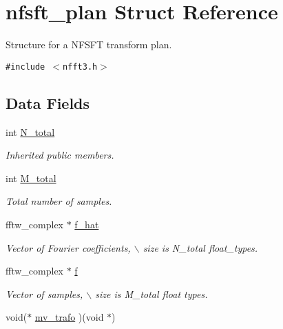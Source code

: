\hypertarget{structnfsft__plan}{
\section{nfsft\_\-plan Struct Reference}
\label{structnfsft__plan}
}
Structure for a NFSFT transform plan.  


{\tt \#include $<$nfft3.h$>$}

\subsection*{Data Fields}
\begin{CompactItemize}
\item 
int \hyperlink{structnfsft__plan_57fe4569f9109b92ed55caeddce686b8}{N\_\-total}
\begin{CompactList}\small\item\em Inherited public members. \item\end{CompactList}\item 
\hypertarget{structnfsft__plan_e83b4ef24662500a1c0374f9e0bf73ed}{
int \hyperlink{structnfsft__plan_e83b4ef24662500a1c0374f9e0bf73ed}{M\_\-total}}
\label{structnfsft__plan_e83b4ef24662500a1c0374f9e0bf73ed}

\begin{CompactList}\small\item\em Total number of samples. \item\end{CompactList}\item 
\hypertarget{structnfsft__plan_f3f147694cf5d7ac7b658288bf2cfb42}{
fftw\_\-complex $\ast$ \hyperlink{structnfsft__plan_f3f147694cf5d7ac7b658288bf2cfb42}{f\_\-hat}}
\label{structnfsft__plan_f3f147694cf5d7ac7b658288bf2cfb42}

\begin{CompactList}\small\item\em Vector of Fourier coefficients, $\backslash$ size is N\_\-total float\_\-types. \item\end{CompactList}\item 
\hypertarget{structnfsft__plan_ebedb76f2df25603c548ae9672e970df}{
fftw\_\-complex $\ast$ \hyperlink{structnfsft__plan_ebedb76f2df25603c548ae9672e970df}{f}}
\label{structnfsft__plan_ebedb76f2df25603c548ae9672e970df}

\begin{CompactList}\small\item\em Vector of samples, $\backslash$ size is M\_\-total float types. \item\end{CompactList}\item 
\hypertarget{structnfsft__plan_01bf30c31f886ffa9d486c010a452051}{
void($\ast$ \hyperlink{structnfsft__plan_01bf30c31f886ffa9d486c010a452051}{mv\_\-trafo} )(void $\ast$)}
\label{structnfsft__plan_01bf30c31f886ffa9d486c010a452051}


\end{CompactItemize}

